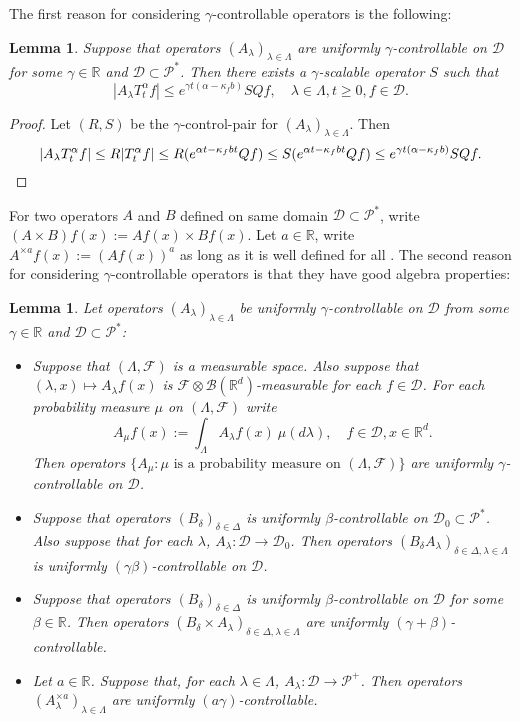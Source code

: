 \documentclass[12pt,oneside,english]{amsart}
\theoremstyle{plain}
\newtheorem{lem}[thm]{Lemma}
\theoremstyle{definition}
\numberwithin{equation}{section}
\newcommand{\added}[1]{{\color{blue}#1}}\newcommand{\deleted}[1]{{\color{red}#1}}
\begin{document}
    The first reason for considering $\gamma$-controllable operators is the following:
\added{
\begin{lem}
    Suppose that operators $(A_\lambda)_{\lambda\in \Lambda}$ are uniformly $\gamma$-controllable on $\mathcal D$ for some $\gamma \in \mathbb R$ and $\mathcal D \subset \mathcal P^*$.
    Then there exists a $\gamma$-scalable operator $S$ such that
\[
    |A_\lambda T_t^\alpha f|
    \leq e^{\gamma t (\alpha  - \kappa_f b)} SQf,
    \quad \lambda \in \Lambda, t\geq 0, f\in \mathcal D.
\]
\end{lem}
}
\added{
\begin{proof}
    Let $(R,S)$ be the $\gamma$-control-pair for $(A_\lambda)_{\lambda\in \Lambda}$.
    Then
\[
    |A_\lambda T_t^\alpha f| \leq R|T_t^\alpha f|
    \leq R (e^{\alpha t  - \kappa_f bt}Qf)
    \leq S (e^{\alpha t  - \kappa_f bt}Qf)
    \leq e^{\gamma t (\alpha  - \kappa_f b)} SQf.
    \qedhere
\]
\end{proof}
}
    For two operators $A$ and $B$ defined on same domain $\mathcal D\subset \mathcal P^*$, write $(A\times B)f (x):= Af(x) \times Bf(x)$.
    Let $a \in \mathbb R$, write $A^{\times a}f(x):= (Af(x))^a$ as long as it is well defined for all .
    The second reason for considering $\gamma$-controllable operators is that they have good algebra properties:
\begin{lem}
\label{lem: property of controllable operators}
    Let operators $(A_\lambda)_{\lambda\in \Lambda}$ be uniformly $\gamma$-controllable on $\mathcal D$ from some $\gamma \in \mathbb R$ and $\mathcal D\subset \mathcal P^*$:
\begin{itemize}
\item[(1)]
    Suppose that $(\Lambda, \mathscr F)$ is a measurable space.
    Also suppose that $(\lambda,x)\mapsto A_\lambda f(x)$ is $\mathscr F \otimes \mathscr B(\mathbb R^d)$-measurable for each $f\in \mathcal D$.
    For each probability measure $\mu$ on $(\Lambda, \mathscr F)$ write
\[
    A_\mu f(x):= \int_{\Lambda} A_\lambda f (x)~\mu(d\lambda), \quad f\in \mathcal D, x\in \mathbb R^d.
\]
    Then operators $\{A_\mu: \mu \text{ is  a probability measure on } (\Lambda, \mathscr F)\}$ are uniformly $\gamma$-controllable on $\mathcal D$.
\item[(2)]
    Suppose that operators $(B_\delta)_{\delta\in \Delta}$ is uniformly $\beta$-controllable on $\mathcal D_0 \subset \mathcal P^*$.
    Also suppose that for each $\lambda$, $A_\lambda:\mathcal D \to \mathcal D_0$.
    Then operators $(B_\delta A_\lambda)_{\delta\in \Delta, \lambda \in \Lambda}$ is uniformly $(\gamma\beta)$-controllable on $\mathcal D$.
\item[(3)]
    Suppose that operators $(B_\delta)_{\delta \in \Delta}$ is uniformly $\beta$-controllable on $\mathcal D$ for some $\beta\in \mathbb R$.
    Then operators $(B_\delta\times A_\lambda)_{\delta \in \Delta, \lambda \in \Lambda}$ are uniformly $(\gamma+\beta)$-controllable.
\item[(4)]
    Let $a\in \mathbb R$. Suppose that, for each $\lambda \in \Lambda$, $A_\lambda : \mathcal D \to \mathcal P^+$.
    Then operators $(A^{\times a}_\lambda)_{\lambda \in \Lambda}$ are uniformly $(a\gamma)$-controllable.
\end{itemize}
\end{lem}
\end{document}
